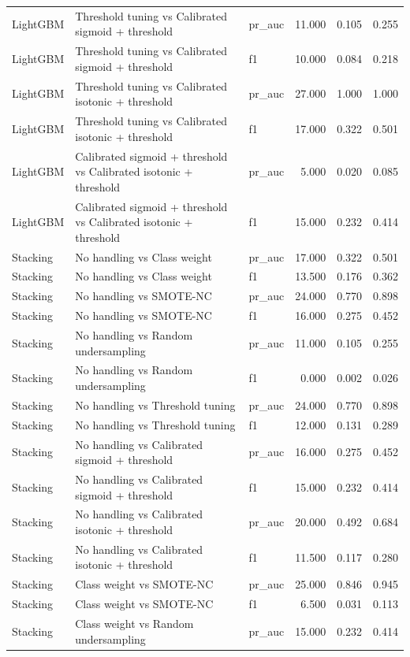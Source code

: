 \begin{tabular}{lllrrr}
LightGBM & Threshold tuning vs Calibrated sigmoid + threshold & pr_auc & 11.000 & 0.105 & 0.255 \\
LightGBM & Threshold tuning vs Calibrated sigmoid + threshold & f1 & 10.000 & 0.084 & 0.218 \\
LightGBM & Threshold tuning vs Calibrated isotonic + threshold & pr_auc & 27.000 & 1.000 & 1.000 \\
LightGBM & Threshold tuning vs Calibrated isotonic + threshold & f1 & 17.000 & 0.322 & 0.501 \\
LightGBM & Calibrated sigmoid + threshold vs Calibrated isotonic + threshold & pr_auc & 5.000 & 0.020 & 0.085 \\
LightGBM & Calibrated sigmoid + threshold vs Calibrated isotonic + threshold & f1 & 15.000 & 0.232 & 0.414 \\
Stacking & No handling vs Class weight & pr_auc & 17.000 & 0.322 & 0.501 \\
Stacking & No handling vs Class weight & f1 & 13.500 & 0.176 & 0.362 \\
Stacking & No handling vs SMOTE-NC & pr_auc & 24.000 & 0.770 & 0.898 \\
Stacking & No handling vs SMOTE-NC & f1 & 16.000 & 0.275 & 0.452 \\
Stacking & No handling vs Random undersampling & pr_auc & 11.000 & 0.105 & 0.255 \\
Stacking & No handling vs Random undersampling & f1 & 0.000 & 0.002 & 0.026 \\
Stacking & No handling vs Threshold tuning & pr_auc & 24.000 & 0.770 & 0.898 \\
Stacking & No handling vs Threshold tuning & f1 & 12.000 & 0.131 & 0.289 \\
Stacking & No handling vs Calibrated sigmoid + threshold & pr_auc & 16.000 & 0.275 & 0.452 \\
Stacking & No handling vs Calibrated sigmoid + threshold & f1 & 15.000 & 0.232 & 0.414 \\
Stacking & No handling vs Calibrated isotonic + threshold & pr_auc & 20.000 & 0.492 & 0.684 \\
Stacking & No handling vs Calibrated isotonic + threshold & f1 & 11.500 & 0.117 & 0.280 \\
Stacking & Class weight vs SMOTE-NC & pr_auc & 25.000 & 0.846 & 0.945 \\
Stacking & Class weight vs SMOTE-NC & f1 & 6.500 & 0.031 & 0.113 \\
Stacking & Class weight vs Random undersampling & pr_auc & 15.000 & 0.232 & 0.414 \\

\end{tabular}
